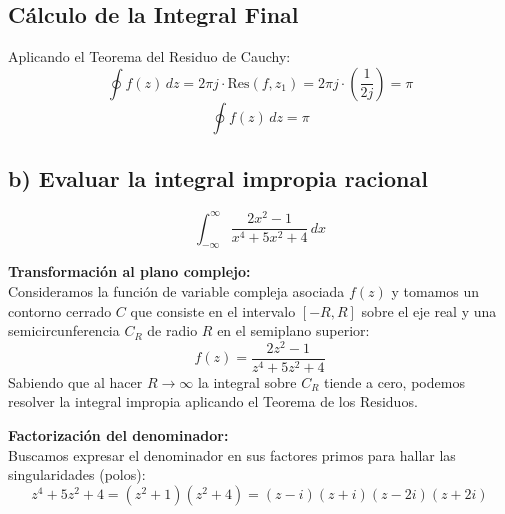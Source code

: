 \documentclass[a4paper, 12pt]{article}
\begin{document}
\subsection*{Cálculo de la Integral Final}
Aplicando el Teorema del Residuo de Cauchy:
 \[
\oint f(z) \, dz = 2\pi j \cdot \text{Res}(f, z_1) = 2\pi j \cdot \left( \frac{1}{2j} \right) = \pi
\] 
\[
\boxed{\oint f(z) \, dz = \pi}
\]

\subsection{b) Evaluar la integral impropia racional}
\[\int_{-\infty}^{\infty} \frac{2x^2 - 1}{x^4 + 5x^2 + 4} \, dx\]

\textbf{Transformación al plano complejo:} \\
Consideramos la función de variable compleja asociada $f(z)$ y tomamos un contorno cerrado $C$ que consiste en el intervalo $[-R, R]$ sobre el eje real y una semicircunferencia $C_R$ de radio $R$ en el semiplano superior:
\[
f(z) = \frac{2z^2 - 1}{z^4 + 5z^2 + 4}
\]
Sabiendo que al hacer $R \to \infty$ la integral sobre $C_R$ tiende a cero, podemos resolver la integral impropia aplicando el Teorema de los Residuos.

\textbf{Factorización del denominador:} \\
Buscamos expresar el denominador en sus factores primos para hallar las singularidades (polos):
\[
z^4 + 5z^2 + 4 = (z^2 + 1)(z^2 + 4) = (z-i)(z+i)(z-2i)(z+2i)
\]
\end{document}
